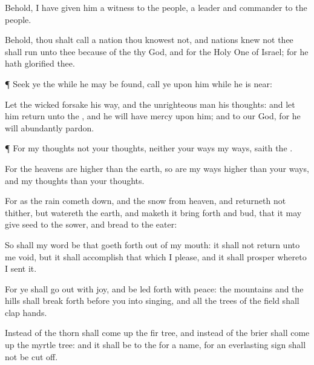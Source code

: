 {Behold, I have
given him
{} a
witness to the
people, a
leader and
commander to the
people.

Behold, thou shalt
call a
nation
{} thou
knowest not, and
nations
{}
knew not thee shall
run unto thee because of the
{} thy
God, and for the Holy
One of
Israel; for he hath
glorified thee.


\par }{\PP {}¶
Seek ye the
{} while he may be
found,
call ye upon him while he is
near:

Let the
wicked
forsake his
way, and the
unrighteous
man his
thoughts: and let him
return unto the
{}, and he will have
mercy upon him; and to our
God, for he will
abundantly
pardon.


\par }{\PP {}¶ For my
thoughts
{} not your
thoughts, neither
{} your
ways my
ways,
saith the
{}.

For
{} the
heavens are
higher than the
earth, so are my
ways
higher than your
ways, and my
thoughts than your
thoughts.

For as the
rain cometh
down, and the
snow from
heaven, and
returneth not thither, but
watereth the
earth, and maketh it bring
forth and
bud, that it may
give
seed to the
sower, and
bread to the
eater:

So shall my
word be that goeth
forth out of my
mouth: it shall not
return unto me
void, but it shall
accomplish that which I
please, and it shall
prosper
{} whereto I
sent it.

For ye shall go
out with
joy, and be led
forth with
peace: the
mountains and the
hills shall break
forth
before you into
singing, and all the
trees of the
field shall
clap
{}
hands.

Instead of the
thorn shall come
up the fir
tree, and instead of the
brier shall come
up the myrtle
tree: and it shall be to the
{} for a
name, for an
everlasting
sign
{} shall not be cut
off.




\par }
